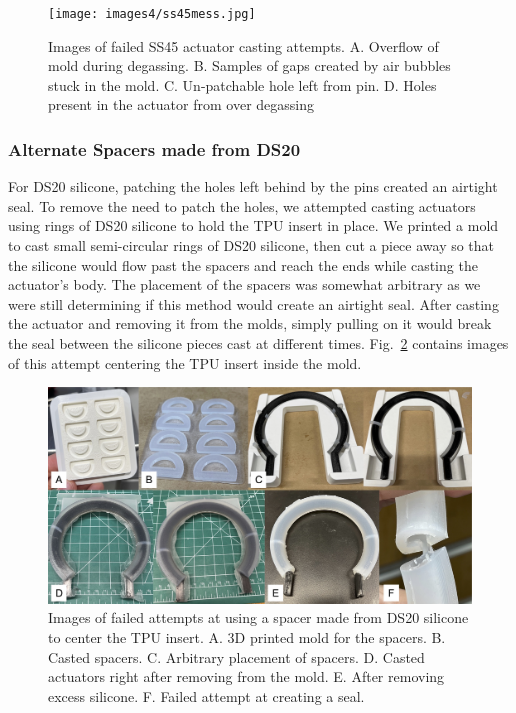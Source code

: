 \begin{figure}[!ht]
    \centering
    \texttt{[image: images4/ss45mess.jpg]}
    \caption{Images of failed SS45 actuator casting attempts. A. Overflow of mold during degassing. B. Samples of gaps created by air bubbles stuck in the mold. C. Un-patchable hole left from pin. D. Holes present in the actuator from over degassing}
    \label{fig:ss45mess}
\end{figure}

\subsubsection{Alternate Spacers made from DS20}

For DS20 silicone, patching the holes left behind by the pins created an airtight seal. To remove the need to patch the holes, we attempted casting actuators using rings of DS20 silicone to hold the TPU insert in place. We printed a mold to cast small semi-circular rings of DS20 silicone, then cut a piece away so that the silicone would flow past the spacers and reach the ends while casting the actuator's body. The placement of the spacers was somewhat arbitrary as we were still determining if this method would create an airtight seal. After casting the actuator and removing it from the molds, simply pulling on it would break the seal between the silicone pieces cast at different times. Fig.~\ref{fig:ds20spacer} contains images of this attempt centering the TPU insert inside the mold. \\

\begin{figure}[ht!]
    \centering
    \includegraphics[width=5.5 in]{images4/ds20spacer.jpg}
    \caption{Images of failed attempts at using a spacer made from DS20 silicone to center the TPU insert. A. 3D printed mold for the spacers. B. Casted spacers. C. Arbitrary placement of spacers. D. Casted actuators right after removing from the mold. E. After removing excess silicone. F. Failed attempt at creating a seal.}
    \label{fig:ds20spacer}
\end{figure}

